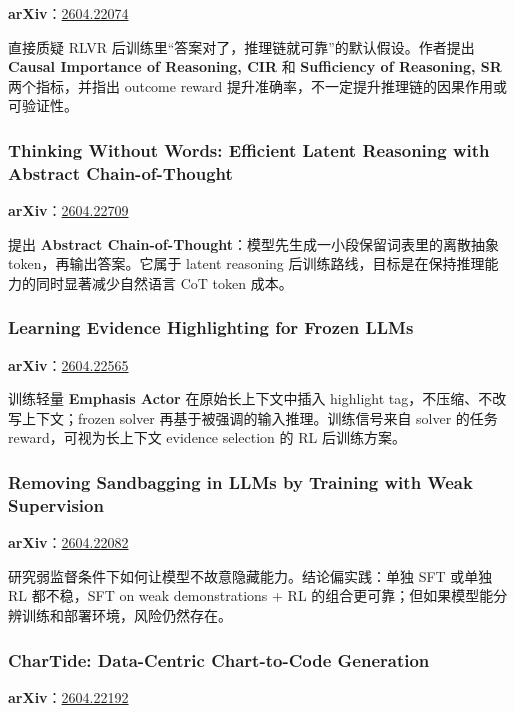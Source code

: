 \textbf{arXiv}：\href{https://arxiv.org/abs/2604.22074}{2604.22074}

直接质疑 RLVR 后训练里“答案对了，推理链就可靠”的默认假设。作者提出 \textbf{Causal Importance of Reasoning, CIR} 和 \textbf{Sufficiency of Reasoning, SR} 两个指标，并指出 outcome reward 提升准确率，不一定提升推理链的因果作用或可验证性。

\subsubsection{Thinking Without Words: Efficient Latent Reasoning with Abstract Chain-of-Thought}

\textbf{arXiv}：\href{https://arxiv.org/abs/2604.22709}{2604.22709}

提出 \textbf{Abstract Chain-of-Thought}：模型先生成一小段保留词表里的离散抽象 token，再输出答案。它属于 latent reasoning 后训练路线，目标是在保持推理能力的同时显著减少自然语言 CoT token 成本。

\subsubsection{Learning Evidence Highlighting for Frozen LLMs}

\textbf{arXiv}：\href{https://arxiv.org/abs/2604.22565}{2604.22565}

训练轻量 \textbf{Emphasis Actor} 在原始长上下文中插入 highlight tag，不压缩、不改写上下文；frozen solver 再基于被强调的输入推理。训练信号来自 solver 的任务 reward，可视为长上下文 evidence selection 的 RL 后训练方案。

\subsubsection{Removing Sandbagging in LLMs by Training with Weak Supervision}

\textbf{arXiv}：\href{https://arxiv.org/abs/2604.22082}{2604.22082}

研究弱监督条件下如何让模型不故意隐藏能力。结论偏实践：单独 SFT 或单独 RL 都不稳，SFT on weak demonstrations + RL 的组合更可靠；但如果模型能分辨训练和部署环境，风险仍然存在。

\subsubsection{CharTide: Data-Centric Chart-to-Code Generation}

\textbf{arXiv}：\href{https://arxiv.org/abs/2604.22192}{2604.22192}


